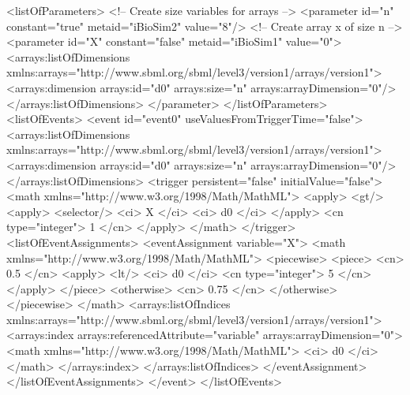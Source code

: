 \begin{example}
<listOfParameters>
    <!-- Create size variables for arrays -->
    <parameter id="n" constant="true" metaid="iBioSim2" value="8"/>
    <!-- Create array x of size n -->
    <parameter id="X" constant="false" metaid="iBioSim1" value="0">
        <arrays:listOfDimensions
            xmlns:arrays="http://www.sbml.org/sbml/level3/version1/arrays/version1">
            <arrays:dimension arrays:id="d0" arrays:size="n" arrays:arrayDimension="0"/>
        </arrays:listOfDimensions>
    </parameter>
</listOfParameters>
<listOfEvents>
    <event id="event0" useValuesFromTriggerTime="false">
        <arrays:listOfDimensions
            xmlns:arrays="http://www.sbml.org/sbml/level3/version1/arrays/version1">
            <arrays:dimension arrays:id="d0" arrays:size="n" arrays:arrayDimension="0"/>
        </arrays:listOfDimensions>
        <trigger persistent="false" initialValue="false">
            <math xmlns="http://www.w3.org/1998/Math/MathML">
                <apply>
                    <gt/>
                    <apply>
                        <selector/>
                        <ci> X </ci>
                        <ci> d0 </ci>
                    </apply>
                    <cn type="integer"> 1 </cn>
                </apply>
            </math>
        </trigger>
        <listOfEventAssignments>
            <eventAssignment variable="X">
                <math xmlns="http://www.w3.org/1998/Math/MathML">
                    <piecewise>
                        <piece>
                            <cn> 0.5 </cn>
                            <apply>
                                <lt/>
                                <ci> d0 </ci>
                                <cn type="integer"> 5 </cn>
                            </apply>
                        </piece>
                        <otherwise>
                            <cn> 0.75 </cn>
                        </otherwise>
                    </piecewise>
                </math>
                <arrays:listOfIndices
                    xmlns:arrays="http://www.sbml.org/sbml/level3/version1/arrays/version1">
                    <arrays:index arrays:referencedAttribute="variable" arrays:arrayDimension="0">
                        <math xmlns="http://www.w3.org/1998/Math/MathML">
                            <ci> d0 </ci>
                        </math>
                    </arrays:index>
                </arrays:listOfIndices>
            </eventAssignment>
        </listOfEventAssignments>
    </event>
</listOfEvents>
\end{example}


